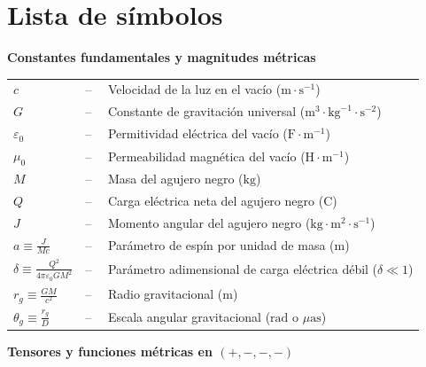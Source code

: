 \chapter*{\hfill{\centering Lista de símbolos}\hfill}
\vspace{0.5cm}
\normalsize

\noindent\textbf{Constantes fundamentales y magnitudes métricas}
\vspace{0.2cm}

\begin{tabular}{ll}
$c$ & --$\quad$ Velocidad de la luz en el vacío ($\text{m}\cdot\text{s}^{-1}$)\\
$G$ & --$\quad$ Constante de gravitación universal ($\text{m}^3\cdot\text{kg}^{-1}\cdot\text{s}^{-2}$)\\
$\varepsilon_0$ & --$\quad$ Permitividad eléctrica del vacío ($\text{F}\cdot\text{m}^{-1}$)\\
$\mu_0$ & --$\quad$ Permeabilidad magnética del vacío ($\text{H}\cdot\text{m}^{-1}$)\\
$M$ & --$\quad$ Masa del agujero negro ($\text{kg}$)\\
$Q$ & --$\quad$ Carga eléctrica neta del agujero negro ($\text{C}$)\\
$J$ & --$\quad$ Momento angular del agujero negro ($\text{kg}\cdot\text{m}^2\cdot\text{s}^{-1}$)\\
$a \equiv \frac{J}{Mc}$ & --$\quad$ Parámetro de espín por unidad de masa ($\text{m}$)\\
$\delta \equiv \frac{Q^2}{4\pi\varepsilon_0 G M^2}$ & --$\quad$ Parámetro adimensional de carga eléctrica débil ($\delta \ll 1$)\\
$r_g \equiv \frac{GM}{c^2}$ & --$\quad$ Radio gravitacional ($\text{m}$)\\
$\theta_g \equiv \frac{r_g}{D}$ & --$\quad$ Escala angular gravitacional ($\text{rad}$ o $\mu\text{as}$)\\
\end{tabular}

\vspace{0.5cm}
\noindent\textbf{Tensores y funciones métricas en $(+,-,-,-)$}
\vspace{0.2cm}

